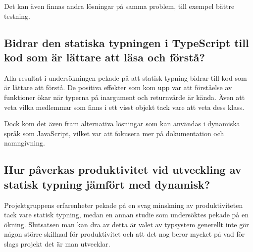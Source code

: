 Det kan även finnas andra lösningar på samma problem, till exempel bättre testning. 
\subsection{Bidrar den statiska typningen i TypeScript till kod som är lättare att läsa och förstå?}
Alla resultat i undersökningen pekade på att statisk typning bidrar till kod som är lättare att förstå. De positiva effekter som kom upp var att förståelse av funktioner ökar när typerna på inargument och returnvärde är kända. Även att veta vilka medlemmar som finns i ett visst objekt tack vare att veta dess klass.

Dock kom det även fram alternativa lösningar som kan användas i dynamiska språk som JavaScript, vilket var att fokusera mer på dokumentation och namngivning.
\subsection{Hur påverkas produktivitet vid utveckling av statisk typning jämfört med dynamisk?}
Projektgruppens erfarenheter pekade på en svag minskning av produktiviteten tack vare statisk typning, medan en annan studie som undersöktes pekade på en ökning. Slutsatsen man kan dra av detta är valet av typsystem generellt inte gör någon större skillnad för produktivitet och att det nog beror mycket på vad för slags projekt det är man utvecklar.
